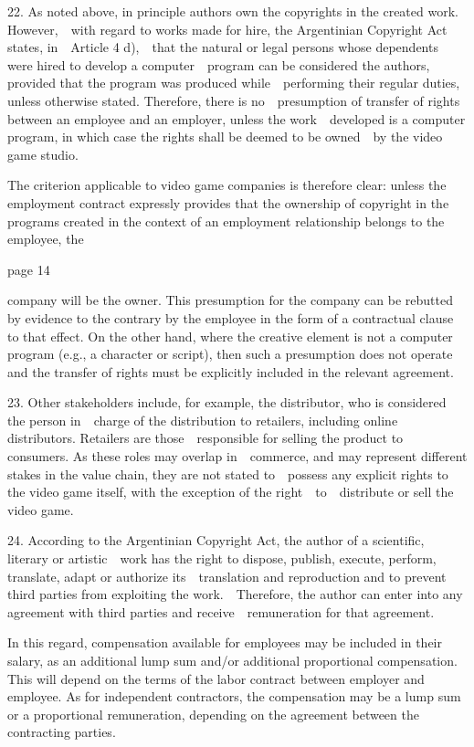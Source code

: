 \documentclass[
]{article}
\begin{document}
{22. }{As noted above, in principle authors own the copyrights in the
created work. However,~~with regard to works made for hire, the
Argentinian }{Copyright Act }{states, in~~Article 4 d),~~that the
natural or legal persons whose dependents were hired to develop a
computer~~program can be considered the authors, provided that the
program was produced while~~performing their regular duties, unless
otherwise stated. Therefore, there is no~~presumption of transfer of
rights between an employee and an employer, unless the work~~developed
is a computer program, in which case the rights shall be deemed to be
owned~~by the video game studio.}

{The criterion applicable to video game companies is therefore clear:
unless the employment contract expressly provides that the ownership of
copyright in the programs created in the context of an employment
relationship belongs to the employee, the}

{page 14}

{company will be the owner. This presumption for the company can be
rebutted by evidence to the contrary by the employee in the form of a
contractual clause to that effect. On the other hand, where the creative
element is not a computer program (e.g., a character or script), then
such a presumption does not operate and the transfer of rights must be
explicitly included in the relevant agreement.}

{23. }{Other stakeholders include, for example, the distributor, who is
considered the person in~~charge of the distribution to retailers,
including online distributors. Retailers are those~~responsible for
selling the product to consumers. As these roles may overlap
in~~commerce, and may represent different stakes in the value chain,
they are not stated to~~possess any explicit rights to the video game
itself, with the exception of the right~~to~~distribute or sell the
video game.}

{24. }{According to the Argentinian }{Copyright Act}{, the author of a
scientific, literary or artistic~~work has the right to dispose,
publish, execute, perform, translate, adapt or authorize
its~~translation and reproduction and to prevent third parties from
exploiting the work.~~Therefore, the author can enter into any agreement
with third parties and receive~~remuneration for that agreement.}

{In this regard, compensation available for employees may be included in
their salary, as an additional lump sum and/or additional proportional
compensation. This will depend on the terms of the labor contract
between employer and employee. As for independent contractors, the
compensation may be a lump sum or a proportional remuneration, depending
on the agreement between the contracting parties.}
\end{document}
